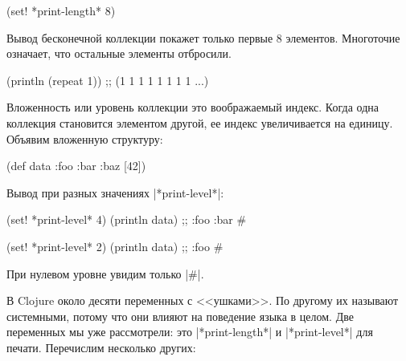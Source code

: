 \begin{english}
  \begin{clojure}
(set! *print-length* 8)
  \end{clojure}
\end{english}

\noindent
Вывод бесконечной коллекции покажет только первые 8 элементов. Многоточие
означает, что остальные элементы отбросили.

\begin{english}
  \begin{clojure}
(println (repeat 1))
;; (1 1 1 1 1 1 1 1 ...)
  \end{clojure}
\end{english}

Вложенность или уровень коллекции это воображаемый индекс. Когда одна коллекция
становится элементом другой, ее индекс увеличивается на единицу. Объявим
вложенную структуру:

\begin{english}
  \begin{clojure}
(def data {:foo {:bar {:baz [42]}}})
  \end{clojure}
\end{english}

\noindent
Вывод при разных значениях \spverb|*print-level*|:

\begin{english}
  \begin{clojure}
(set! *print-level* 4)
(println data)
;; {:foo {:bar #}}

(set! *print-level* 2)
(println data)
;; {:foo #}
  \end{clojure}
\end{english}

\noindent
При нулевом уровне увидим только \spverb|#|.

В Clojure около десяти переменных с <<ушками>>. По другому их называют
системными, потому что они влияют на поведение языка в целом. Две переменных мы
уже рассмотрели: это \spverb|*print-length*| и \spverb|*print-level*| для
печати. Перечислим несколько других:

